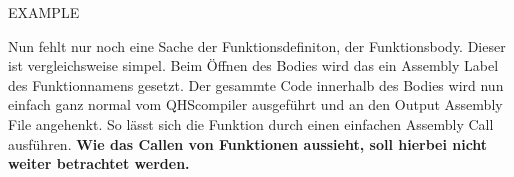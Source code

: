 EXAMPLE

Nun fehlt nur noch eine Sache der Funktionsdefiniton, der Funktionsbody. Dieser ist vergleichsweise simpel. Beim Öffnen des Bodies wird das ein Assembly Label des Funktionnamens gesetzt.
Der gesammte Code innerhalb des Bodies wird nun einfach ganz normal vom QHScompiler ausgeführt und an den Output Assembly File angehenkt. So lässt sich die Funktion durch einen einfachen Assembly Call ausführen.
\textbf{Wie das Callen von Funktionen aussieht, soll hierbei nicht weiter betrachtet werden.}





